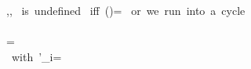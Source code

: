 \begin{RuleFrame}
\begin{MDefinition}{\Norm{\p}{\Path},\Norm{\p}{\T},\Norm{\p}{\mhT\Opt\e}}
\Norm{\p}{\Path\Many\mx}
\mbox{ is undefined}
\mbox{ iff }\p(\Path)=\emptyset
\mbox{ or we run into a cycle}
\\


\Norm{}\\\quad=
\Norm\p{\Opt\e}
\\\mbox{ with }\T'_i=\Norm{}
\end{MDefinition}
\\

\end{RuleFrame}
